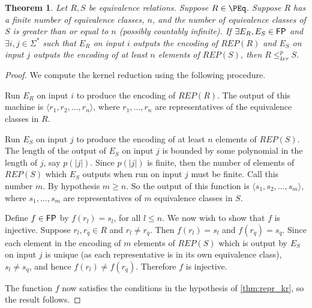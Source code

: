 \documentclass{article}
\newtheorem{theorem}{Theorem}[section]
\theoremstyle{definition} \newtheorem{definition}[definition]{Definition}
\newcommand{\sigmastar}{\Sigma^{*}} %
\newcommand{\kr}{\leq^{p}_{ker}} %
\newcommand{\defn}[1]{\emph{#1}} %
\begin{document}
\begin{theorem}\label{thm:reps}
  Let $R,S$ be equivalence relations. Suppose $R\in\PEq$. Suppose $R$ has a
  finite number of equivalence classes, $n$, and the number of equivalence
  classes of $S$ is greater than or equal to $n$ (possibly countably
  infinite). If $\exists E_R,E_S\in{\ensuremath{\mathsf{FP}}}$ and $\exists i,j\in\sigmastar$ such
  that $E_R$ on input $i$ outputs the encoding of $REP(R)$ and $E_S$ on input
  $j$ outputs the encoding of at least $n$ elements of $REP(S)$, then $R\kr S$.
\end{theorem}
\begin{proof}
  We compute the kernel reduction using the following procedure.

  Run $E_R$ on input $i$ to produce the encoding of $REP(R)$. The output of
  this machine is $\langle r_1, r_2, \ldots, r_n\rangle$, where $r_1,\dots,r_n$
  are representatives of the equivalence classes in $R$.

  Run $E_S$ on input $j$ to produce the encoding of at least $n$ elements of
  $REP(S)$. The length of the output of $E_S$ on input $j$ is bounded by some
  polynomial in the length of $j$, say $p(|j|)$. Since $p(|j|)$ is finite, then
  the number of elements of $REP(S)$ which $E_S$ outputs when run on input $j$
  must be finite. Call this number $m$. By hypothesis $m\geq n$. So the output
  of this function is $\langle s_1, s_2, \ldots, s_m\rangle$, where
  $s_1,\ldots, s_m$ are representatives of $m$ equivalence classes in $S$.

  Define $f\in{\ensuremath{\mathsf{FP}}}$ by $f(r_l)=s_l$, for all $l\leq n$. We now wish to show that
  $f$ is injective. Suppose $r_l,r_q\in R$ and $r_l\neq r_q$. Then $f(r_l)=s_l$
  and $f(r_q)=s_q$. Since each element in the encoding of $m$ elements of
  $REP(S)$ which is output by $E_S$ on input $j$ is unique (as each
  representative is in its own equivalence class), $s_l\neq s_q$, and hence
  $f(r_l)\neq f(r_q)$. Therefore $f$ is injective.

  The function $f$ now satisfies the conditions in the hypothesis of
  \autoref{thm:repr_kr}, so the result follows.
\end{proof}



\end{document}
